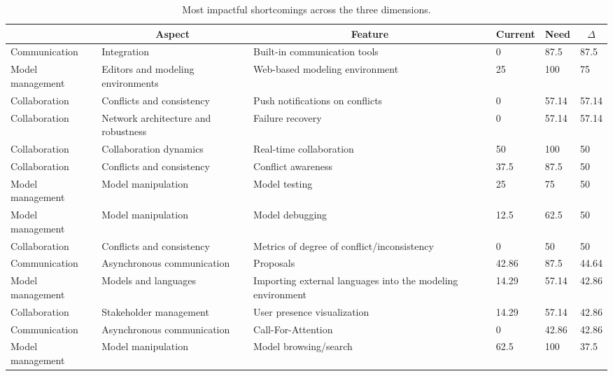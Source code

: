 
  \begin{table*}[]
  \centering
  \notsotiny
  \caption{ Most impactful shortcomings across the three dimensions.}
\label{tab:most-impactful}
\begin{tabular}{|l|l|l|l|l|l|}
  \hline
  \rowcolor[HTML]{C0C0C0}
    \multicolumn{1}{|c|}{Dimension} & \multicolumn{1}{c|}{Aspect} & \multicolumn{1}{c|}{Feature} & \multicolumn{1}{c|}{Current} & \multicolumn{1}{c|}{Need} & \multicolumn{1}{c|}{$\Delta$} \\ \hline
    Communication & Integration & Built-in communication tools & 0 & 87.5 & 87.5 \\ \hline 
Model management & Editors and modeling environments & Web-based modeling environment & 25 & 100 & 75 \\ \hline 
Collaboration & Conflicts and consistency & Push notifications on conflicts & 0 & 57.14 & 57.14 \\ \hline 
Collaboration & Network architecture and robustness & Failure recovery & 0 & 57.14 & 57.14 \\ \hline 
Collaboration & Collaboration dynamics & Real-time collaboration & 50 & 100 & 50 \\ \hline 
Collaboration & Conflicts and consistency & Conflict awareness & 37.5 & 87.5 & 50 \\ \hline 
Model management & Model manipulation & Model testing & 25 & 75 & 50 \\ \hline 
Model management & Model manipulation & Model debugging & 12.5 & 62.5 & 50 \\ \hline 
Collaboration & Conflicts and consistency & Metrics of degree of conflict/inconsistency & 0 & 50 & 50 \\ \hline 
Communication & Asynchronous communication & Proposals & 42.86 & 87.5 & 44.64 \\ \hline 
Model management & Models and languages & Importing external languages into the modeling environment & 14.29 & 57.14 & 42.86 \\ \hline 
Collaboration & Stakeholder management & User presence visualization & 14.29 & 57.14 & 42.86 \\ \hline 
Communication & Asynchronous communication & Call-For-Attention & 0 & 42.86 & 42.86 \\ \hline 
Model management & Model manipulation & Model browsing/search & 62.5 & 100 & 37.5 \\ \hline 

\end{tabular}
\end{table*}
